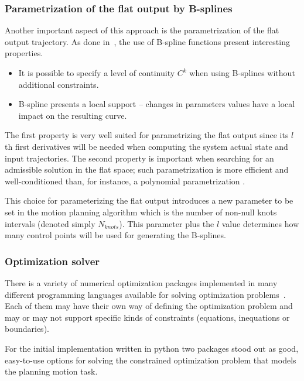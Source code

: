 \subsubsection{Parametrization of the flat output by B-splines}

Another important aspect of this approach is the parametrization of 
the flat output trajectory. As done in~\cite{Milam2003}, the use
of B-spline functions present interesting properties.
\begin{itemize}


 \item It is possible to specify a level of continuity $C^k$ when using
 B-splines without additional constraints.
 
 \item B-spline presents a local support -- changes in parameters values have a 
 local impact on the resulting curve.
 
 
\end{itemize}
The first property is very well suited for parametrizing the flat output since
its $l$th first derivatives will be needed when computing the system actual state
and input trajectories. The second property is important when searching for an
admissible solution in the flat space; such parametrization is more efficient
and well-conditioned than, for instance, a polynomial parametrization \cite{Milam2003}.


This choice for parameterizing the flat output introduces a new parameter to be set in
the motion planning algorithm which is the number of non-null knots intervals 
(denoted simply $N_{knots}$). This parameter plus the $l$ value determines how many 
control points will be used for generating the B-splines.

\subsubsection{Optimization solver}


There is a variety of numerical optimization packages implemented in many different programming languages available for solving optimization problems~\cite{pyopt-paper}. Each of them may have their own way of defining the optimization problem and may or may not support specific kinds of constraints (equations, inequations or boundaries).

For the initial implementation written in python two packages stood out as good, easy-to-use options for solving the constrained optimization problem that models the planning motion task.

